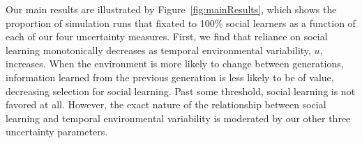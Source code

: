 \documentclass[letterpaper,11.5pt]{scrartcl}
\begin{document}


Our main results are illustrated by Figure~\ref{fig:mainResults}, which shows the proportion of simulation runs that fixated to 100\% social learners as a function of each of our four uncertainty measures.  First, we find that reliance on social learning monotonically decreases as temporal environmental variability, $u$, increases. When the environment is more likely to change between generations, information learned from the previous generation is less likely to be of value, decreasing selection for social learning. Past some threshold, social learning is not favored at all. However, the exact nature of the relationship between social learning and temporal environmental variability is moderated by our other three uncertainty parameters. 
\end{document}
